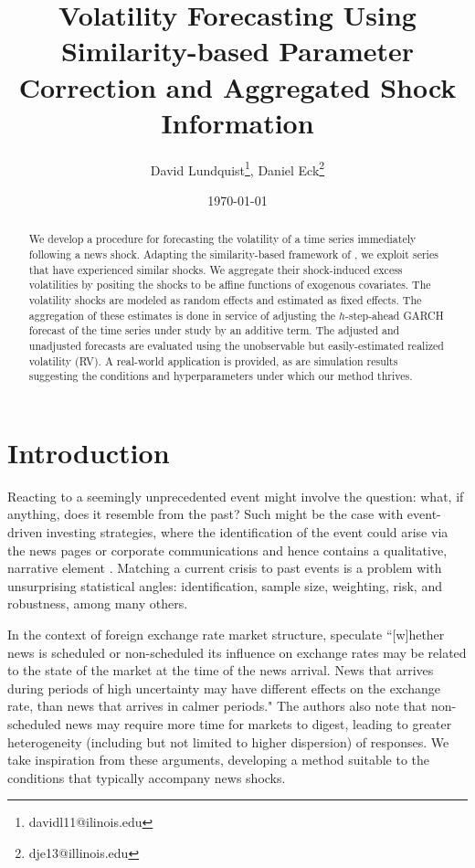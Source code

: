 \documentclass[11pt]{article}
\title{Volatility Forecasting Using Similarity-based Parameter Correction and Aggregated Shock Information}
\author{David Lundquist\thanks{davidl11@ilinois.edu}, Daniel Eck\thanks{dje13@illinois.edu} }
\affil{Department of Statistics, University of Illinois at Urbana-Champaign}
\date{\today}
\theoremstyle{definition}
\begin{document}
\maketitle

\begin{abstract} 
We develop a procedure for forecasting the volatility of a time series immediately following a news shock.  Adapting the similarity-based framework of \citet{lin2021minimizing}, we exploit series that have experienced similar shocks.  We aggregate their shock-induced excess volatilities by positing the shocks to be affine functions of exogenous covariates.  The volatility shocks are modeled as random effects and estimated as fixed effects.  The aggregation of these estimates is done in service of adjusting the $h$-step-ahead GARCH forecast of the time series under study by an additive term.  The adjusted and unadjusted forecasts are evaluated using the unobservable but easily-estimated realized volatility (RV).  A real-world application is provided, as are simulation results suggesting the conditions and hyperparameters under which our method thrives.
\end{abstract}

\section{Introduction}

Reacting to a seemingly unprecedented event might involve the question: what, if anything, does it resemble from the past?  Such might be the case with event-driven investing strategies, where the identification of the event could arise via the news pages or corporate communications and hence contains a qualitative, narrative element \citep{Kenton}.  Matching a current crisis to past events is a problem with unsurprising statistical angles: identification, sample size, weighting, risk, and robustness, among many others.  

In the context of foreign exchange rate market structure, \citet{dominguez2006defines} speculate ``[w]hether news is scheduled or non-scheduled its influence on exchange rates may be related
to the state of the market at the time of the news arrival.  News that arrives during periods of
high uncertainty may have different effects on the exchange rate, than news that arrives in
calmer periods." The authors also note that non-scheduled news may require more time for markets to digest, leading to greater heterogeneity (including but not limited to higher dispersion) of responses.  We take inspiration from these arguments, developing a method suitable to the conditions that typically accompany news shocks. 
\end{document}
